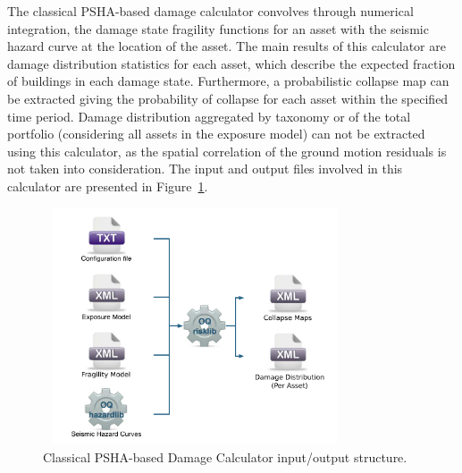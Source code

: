 The classical PSHA-based damage calculator convolves through numerical
integration, the damage state fragility functions for an asset with the
seismic hazard curve at the location of the asset. The main results of this
calculator are damage distribution statistics for each asset, which describe
the expected fraction of buildings in each damage state. Furthermore, a
probabilistic collapse map can be extracted giving the probability of collapse
for each asset within the specified time period. Damage distribution
aggregated by taxonomy or of the total portfolio (considering all assets in
the exposure model) can not be extracted using this calculator, as the spatial
correlation of the ground motion residuals is not taken into consideration.
The input and output files involved in this calculator are presented in
Figure~\ref{fig:io-structure-classical-damage}.

\begin{figure}[ht]
\centering
\includegraphics[width=9cm,height=7cm]{figures/risk/io-structure-classical-damage.pdf}
\caption{Classical PSHA-based Damage Calculator input/output structure.}
\label{fig:io-structure-classical-damage}
\end{figure}
